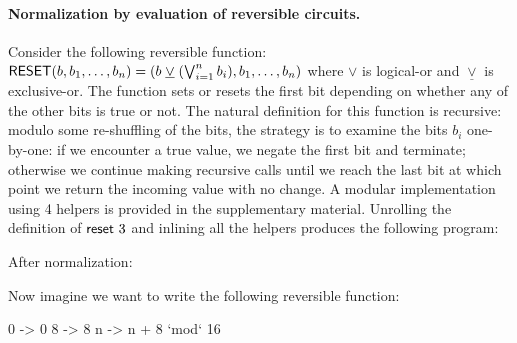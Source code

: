 \paragraph*{Normalization by evaluation of reversible circuits.} Consider the following reversible function:
$\Afun{RESET}(b,b_1,\ldots,b_n) = (b \; \underline{\vee} \; (\bigvee_{i=1}^n b_i),b_1,\ldots,b_n)$ where $\vee$ is
logical-or and $\underline{\vee}$ is exclusive-or. The function sets or resets the first bit depending on whether any of
the other bits is true or not. The natural definition for this function is recursive: modulo some re-shuffling of the
bits, the strategy is to examine the bits $b_i$ one-by-one: if we encounter a true value, we negate the first bit and
terminate; otherwise we continue making recursive calls until we reach the last bit at which point we return the
incoming value with no change. A modular implementation using 4 helpers is provided in the supplementary
material. Unrolling the definition of $\Afun{reset}~3$ and inlining all the helpers produces the following program:

  \begin{center}
  \resizebox{0.5\textwidth}{!}{}
  \end{center}

  \resetthree{}

After normalization:

  \resetnormthree{}

Now imagine we want to write the following reversible function:

0 -> 0
8 -> 8
n -> n + 8 `mod` 16






